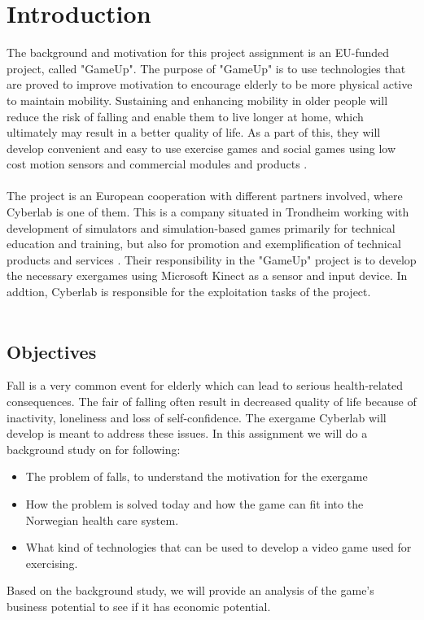\chapter{Introduction}
The background and motivation for this project assignment is an EU-funded project, called "GameUp". The purpose of "GameUp" is to use technologies that are proved to improve motivation to encourage elderly to be more physical active to maintain mobility. Sustaining and enhancing mobility in older people will reduce the risk of falling and enable them to live longer at home, which ultimately may result in a better quality of life. As a part of this, they will develop convenient and easy to use exercise games and social games using low cost motion sensors and commercial modules and products \cite{gameup}.\\ \\ The project is an European cooperation with different partners involved, where Cyberlab is one of them. This is a company situated in Trondheim working with development of simulators and simulation-based games primarily for technical education and training, but also for promotion and exemplification of technical products and services \cite{cyberlab}. Their responsibility in the "GameUp" project is to develop the necessary exergames using Microsoft Kinect as a sensor and input device. In addtion, Cyberlab is responsible for the exploitation tasks of the project.  \\ \\

\section{Objectives}
Fall is a very common event for elderly which can lead to serious health-related consequences. The fair of falling often result in decreased quality of life because of inactivity, loneliness and loss of self-confidence. The exergame Cyberlab will develop is meant to address these issues. In this assignment we will do a background study on for following:
\begin{itemize}
\renewcommand{\labelitemi}{$\bullet$}
\item The problem of falls, to understand the motivation for the exergame 
\item How the problem is solved today and how the game can fit into the Norwegian health care system.
\item What kind of technologies that can be used to develop a video game used for exercising.
\end{itemize}
Based on the background study, we will provide an analysis of the game’s business potential to see if it has economic potential.

